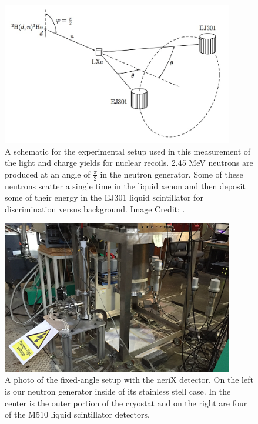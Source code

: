 \begin{figure}[t]
        \centering
	\includegraphics[width=0.9\textwidth]{nerix_expt_schematic}
	\caption{A schematic for the experimental setup used in this measurement of the light and charge yields for nuclear recoils.  2.45 MeV neutrons are produced at an angle of $\frac{\pi}{2}$ in the neutron generator.  Some of these neutrons scatter a single time in the liquid xenon and then deposit some of their energy in the EJ301 liquid scintillator for discrimination versus background.  Image Credit: .}
	\label{fig:nerix_expt_schematic}
\end{figure}


\begin{figure}[bt]
        \centering
	\includegraphics[width=0.9\textwidth]{nerix_experimental_setup}
	\caption{A photo of the fixed-angle setup with the neriX detector.  On the left is our neutron generator inside of its stainless stell case.  In the center is the outer portion of the cryostat and on the right are four of the M510 liquid scintillator detectors.}
	\label{fig:nerix_experimental_setup}
\end{figure}



